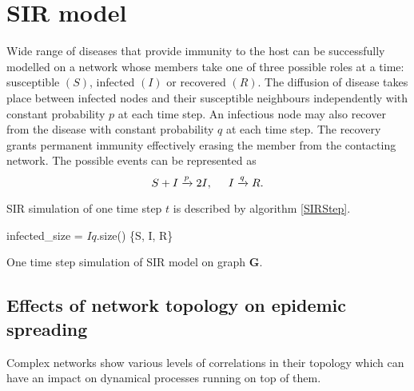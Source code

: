 \documentclass[times, utf8, diplomski]{fer}
\begin{document}
\section{SIR model}
Wide range of diseases that provide immunity to the host can be successfully modelled on a network whose members take 	one of three possible roles at a time: susceptible $(S)$, infected $(I)$ or recovered $(R)$. The diffusion of disease takes place between infected nodes and their susceptible neighbours independently with constant probability $p$ at each time step. An infectious node may also recover from the disease with constant probability $q$ at each time step. The recovery grants permanent immunity effectively erasing the member from the contacting network.  The possible events can be represented as 
\begin{equation*}
S + I \xrightarrow{p} 2I,\hspace{5mm}  I \xrightarrow{q} R.
\end{equation*}

SIR simulation of one time step $t$ is described by algorithm \ref{SIRStep}. %

\vspace{10mm}

\begin{algorithm}[H]
 infected\_size = $Iq$.size()\;
  \Return \{S, I, R\}
 \label{SIRStep}
 \caption{One time step simulation of SIR model on graph $\mathbf{G}$.}
\end{algorithm}

\subsection{Effects of network topology on epidemic spreading}
Complex networks show various levels of correlations in their topology which can have an impact on dynamical processes running on top of them.  %
\end{document}
